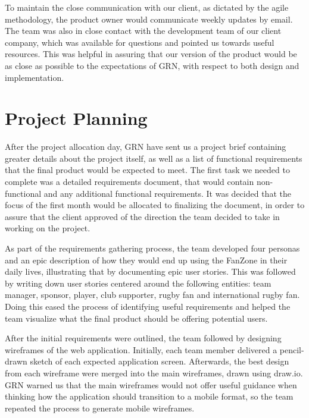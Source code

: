 \documentclass{l3proj}
\begin{document}
 To maintain the close communication with our client, as dictated by the agile methodology, the product owner would communicate weekly updates by email. The team was also in close contact with the development team of our client company, which was available for questions and pointed us towards useful resources. This was helpful in assuring that our version of the product would be as close as possible to the expectations of GRN, with respect to both design and implementation.


\newpage
\section{Project Planning}
\label{sec:planning}

After the project allocation day, GRN have sent us a project brief containing greater details about the project itself, as well as a list of functional requirements that the final product would be expected to meet. The first task we needed to complete was a detailed requirements document, that would contain non-functional and any additional functional requirements. It was decided that the focus of the first month would be allocated to finalizing the document, in order to assure that the client approved of the direction the team decided to take in working on the project.

As part of the requirements gathering process, the team developed four personas and an epic description of how they would end up using the FanZone in their daily lives, illustrating that by documenting epic user stories. This was followed by writing down user stories centered around the following entities: team manager, sponsor, player, club supporter, rugby fan and international rugby fan. Doing this eased the process of identifying useful requirements and helped the team visualize what the final product should be offering potential users.

After the initial requirements were outlined, the team followed by designing wireframes of the web application. Initially, each team member delivered a pencil-drawn sketch of each expected application screen. Afterwards, the best design from each wireframe were merged into the main wireframes, drawn using draw.io. GRN warned us that the main wireframes would not offer useful guidance when thinking how the application should transition to a mobile format, so the team repeated the process to generate mobile wireframes.
\end{document}

